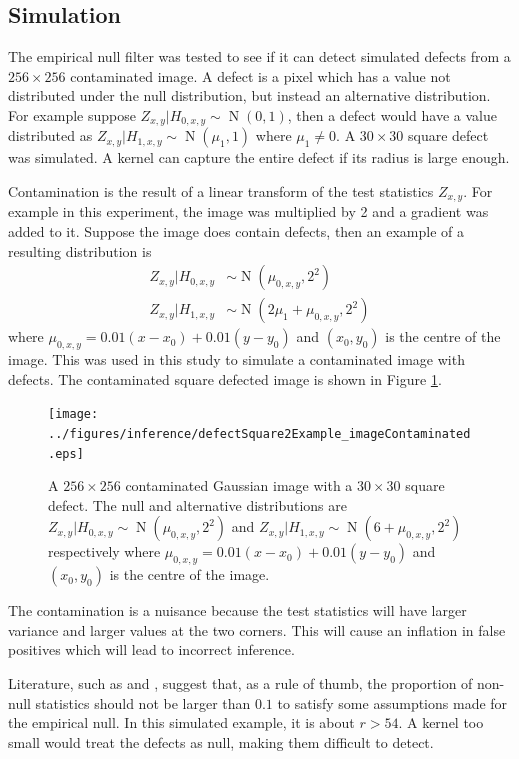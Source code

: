 \documentclass{proc}
\DeclareMathOperator{\normal}{N}
\begin{document}
\subsection{Simulation}

The empirical null filter was tested to see if it can detect simulated defects from a $256\times 256$ contaminated image. A defect is a pixel which has a value not distributed under the null distribution, but instead an alternative distribution. For example suppose $Z_{x,y}|H_{0,x,y}\sim\normal(0,1)$, then a defect would have a value distributed as $Z_{x,y}|H_{1,x,y}\sim\normal(\mu_{1},1)$ where $\mu_1\neq0$. A $30\times 30$ square defect was simulated. A kernel can capture the entire defect if its radius is large enough.

Contamination is the result of a linear transform of the test statistics $Z_{x,y}$. For example in this experiment, the image was multiplied by 2 and a gradient was added to it. Suppose the image does contain defects, then an example of a resulting distribution is
\begin{align}
  Z_{x,y}|H_{0,x,y}&\sim\normal(\mu_{0,x,y},2^2)
  \\
  Z_{x,y}|H_{1,x,y}&\sim\normal(2\mu_1+\mu_{0,x,y},2^2)
\end{align}
where $\mu_{0,x,y}=0.01(x-x_0)+0.01(y-y_0)$ and $(x_0,y_0)$ is the centre of the image. This was used in this study to simulate a contaminated image with defects. The contaminated square defected image is shown in Figure \ref{fig:inference_defectSquare2Example}.

\begin{figure}
  \centering
  \texttt{[image: ../figures/inference/defectSquare2Example\_imageContaminated.eps]}
  \caption{A $256\times 256$ contaminated Gaussian image with a $30 \times 30$ square defect. The null and alternative distributions are $Z_{x,y}|H_{0,x,y}\sim\normal(\mu_{0,x,y},2^2)$ and $Z_{x,y}|H_{1,x,y}\sim\normal(6+\mu_{0,x,y},2^2)$ respectively where $\mu_{0,x,y}=0.01(x-x_0)+0.01(y-y_0)$ and $(x_0,y_0)$ is the centre of the image.}
  \label{fig:inference_defectSquare2Example}
\end{figure}

The contamination is a nuisance because the test statistics will have larger variance and larger values at the two corners. This will cause an inflation in false positives which will lead to incorrect inference. 

Literature, such as \cite{efron2004large} and \cite{schwartzman2008empirical}, suggest that, as a rule of thumb, the proportion of non-null statistics should not be larger than $0.1$ to satisfy some assumptions made for the empirical null. In this simulated example, it is about $r>54$. A kernel too small would treat the defects as null, making them difficult to detect.
\end{document}
